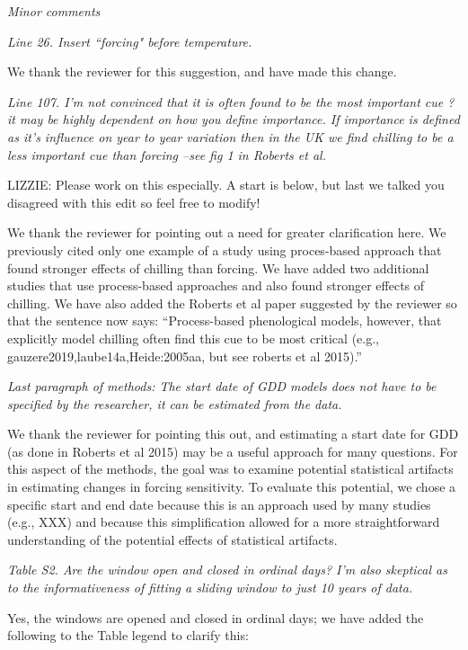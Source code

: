 \documentclass[11pt, a4paper]{article}
\begin{document}
\par \emph{Minor comments}
\par \emph{Line 26. Insert ``forcing" before temperature.}
\par We thank the reviewer for this suggestion, and have made this change.
\par \emph{Line 107. I'm not convinced that it is often found to be the most important cue ? it may be highly
dependent on how you define importance. If importance is defined as it's influence on year to year
variation then in the UK we find chilling to be a less important cue than forcing --see fig 1 in Roberts et
al.}
\par LIZZIE: Please work on this especially. A start is below, but last we talked you disagreed with this edit so feel free to modify!

We thank the reviewer for pointing out a need for greater clarification here. We previously cited only one example of a study using proces-based approach that found stronger effects of chilling than forcing. We have added two additional studies that use process-based approaches and also found stronger effects of chilling. We have also added the Roberts et al paper suggested by the reviewer so that the sentence now says:
``Process-based phenological models, however, that explicitly model chilling often find this cue to be most critical (e.g., gauzere2019,laube14a,Heide:2005aa, but see roberts et al 2015).''

\par \emph{Last paragraph of methods: The start date of GDD models does not have to be specified by the
researcher, it can be estimated from the data.}
\par We thank the reviewer for pointing this out, and estimating a start date for GDD (as done in Roberts et al 2015) may be a useful approach for many questions. For this aspect of the methods, the goal was to examine potential statistical artifacts in estimating changes in forcing sensitivity. To evaluate this potential, we chose a specific start and end date because this is an approach used by many studies (e.g., XXX) and because this simplification allowed for a more straightforward understanding of the potential effects of statistical artifacts.
\par \emph{Table S2. Are the window open and closed in ordinal days? I'm also skeptical as to the informativeness
of fitting a sliding window to just 10 years of data.}
\par Yes, the windows are opened and closed in ordinal days; we have added the following to the Table legend to clarify this:
\end{document}
